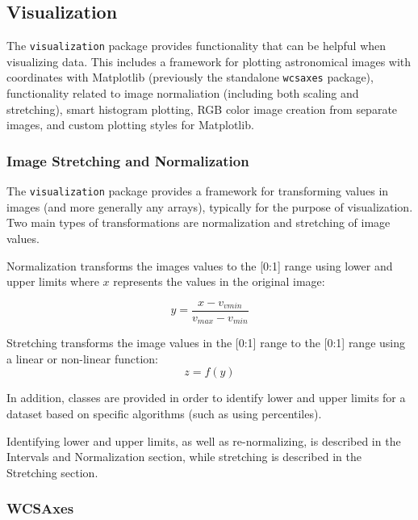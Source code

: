 \documentclass[modern]{aastex61}
\newcommand{\package}[1]{\texttt{#1}}
\begin{document}
\subsection{Visualization}

The \package{visualization} package provides functionality that can be helpful when visualizing data. This includes a framework for plotting astronomical images with coordinates with Matplotlib (previously the standalone \package{wcsaxes} package), functionality related to image normaliation (including both scaling and stretching), smart histogram plotting, RGB color image creation from separate images, and custom plotting styles for Matplotlib.

\subsubsection{Image Stretching and Normalization}

The \package{visualization} package provides a framework for transforming values in images (and more generally any arrays), typically for the purpose of visualization. Two main types of transformations are normalization and stretching of image values.

Normalization transforms the images values to the [0:1] range using lower and upper limits where $x$ represents the values in the original image:

\begin{equation}
y = \frac{x - v_{vmin}}{v_{max} − v_{min}}
\end{equation}

Stretching transforms the image values in the [0:1] range to the [0:1] range using a linear or non-linear function:
\begin{equation}
z = f(y)
\end{equation}

In addition, classes are provided in order to identify lower and upper limits for a dataset based on specific algorithms (such as using percentiles).

Identifying lower and upper limits, as well as re-normalizing, is described in the Intervals and Normalization section, while stretching is described in the Stretching section.

\subsubsection{WCSAxes}
\end{document}
